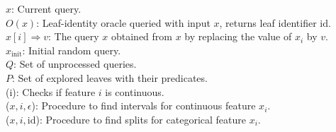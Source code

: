 $x$: Current query. \\
$O(x)$: Leaf-identity oracle queried with input $x$, returns leaf identifier $\text{id}$. \\
$x[i] \Rightarrow v$: The query $x$ obtained from $x$ by replacing the value of $x_i$ by $v$. \\
$x_{\text{init}}$: Initial random query. \\
$Q$: Set of unprocessed queries. \\
$P$: Set of explored leaves with their predicates. \\
(i): Checks if feature $i$ is continuous. \\
($x, i, \epsilon$): Procedure to find intervals for continuous feature $x_i$. \\
($x, i, \text{id}$): Procedure to find splits for categorical feature $x_i$. \\

